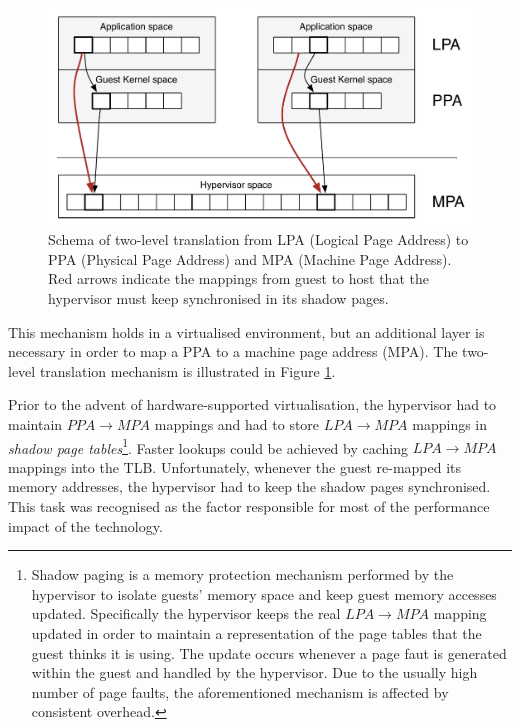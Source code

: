 \begin{figure}[htbp] 
\begin{center}
\includegraphics[scale=0.6]{images/shadow.pdf}
\caption{{Schema of two-level translation from LPA (Logical Page Address) to PPA (Physical Page Address) and MPA (Machine Page Address).  Red arrows indicate the mappings from guest to host that the hypervisor must keep synchronised in its shadow pages.}}
\label{shadow}
\end{center}
\end{figure}



This mechanism holds in a virtualised environment, but an additional layer is necessary in order to map a PPA to a machine page address (MPA). The two-level translation mechanism is illustrated in Figure \ref{shadow}.%


Prior to the advent of hardware-supported virtualisation, the hypervisor had to maintain $PPA \rightarrow MPA$ mappings and had to store $LPA \rightarrow MPA$ mappings in \emph{shadow page tables}\footnote{Shadow paging is a memory protection mechanism performed by the hypervisor to isolate guests' memory space and keep guest memory accesses updated. Specifically the hypervisor keeps the real $LPA \rightarrow MPA$ mapping updated in order to maintain a representation of the page tables that the guest thinks it is using. The update occurs whenever a page faut is generated within the guest and handled by the hypervisor. Due to the usually high number of page faults, the aforementioned mechanism is affected by consistent overhead.}. Faster lookups could be achieved by caching $LPA \rightarrow MPA$ mappings into the TLB. Unfortunately, whenever the guest re-mapped its memory addresses, the hypervisor had to keep the shadow pages synchronised. This task was recognised as the factor responsible for most of the performance impact of the technology.%




